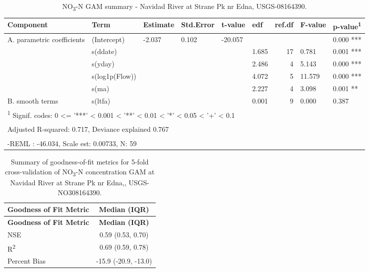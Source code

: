 \documentclass[
]{article}
\newenvironment{widestuff}{\begin{table}[h]\begin{adjustwidth}{-4.5cm}{-4.5cm}\centering}{\end{adjustwidth}\end{table}}
\begin{document}
\begin{widestuff}

\caption{NO\textsubscript{3}-N GAM summary - Navidad River at Strane Pk nr Edna, USGS-08164390.}
\centering
\begin{tabular}[t]{llllllrll}
\toprule
Component & Term & Estimate & Std.Error & t-value & edf & ref.df & F-value & p-value\textsuperscript{1}\\
\midrule
A. parametric coefficients & (Intercept) & -2.037 & 0.102 & -20.057 &  &  &  & 0.000 ***\\
\cmidrule{1-9}
 & s(ddate) &  &  &  & 1.685 & 17 & 0.781 & 0.001 ***\\

 & s(yday) &  &  &  & 2.486 & 4 & 5.143 & 0.000 ***\\

 & s(log1p(Flow)) &  &  &  & 4.072 & 5 & 11.579 & 0.000 ***\\

 & s(ma) &  &  &  & 2.227 & 4 & 3.098 & 0.001 **\\

\multirow[t]{-5}{*}{\raggedright\arraybackslash B. smooth terms} & s(ltfa) &  &  &  & 0.001 & 9 & 0.000 & 0.387\\
\bottomrule
\multicolumn{9}{l}{\textsuperscript{1} Signif. codes: 0 <= '***' < 0.001 < '**' < 0.01 < '*' < 0.05 < '+' < 0.1}\\
\multicolumn{9}{l}{\textsuperscript{} Adjusted R-squared: 0.717, Deviance explained 0.767}\\
\multicolumn{9}{l}{\textsuperscript{} -REML : -46.034, Scale est: 0.00733, N: 59}\\
\end{tabular}
\end{widestuff}

\hypertarget{tbl-NO308164390-CV}{}
\begin{longtable}[]{@{}lc@{}}
\caption{\label{tbl-NO308164390-CV}Summary of goodness-of-fit metrics
for 5-fold cross-validation of NO\textsubscript{3}-N concentration GAM
at Navidad River at Strane Pk nr Edna,,
USGS-NO308164390.}\tabularnewline
\toprule()
\textbf{Goodness of Fit Metric} & \textbf{Median (IQR)} \\
\midrule()
\endfirsthead
\toprule()
\textbf{Goodness of Fit Metric} & \textbf{Median (IQR)} \\
\midrule()
\endhead
NSE & 0.59 (0.53, 0.70) \\
R\textsuperscript{2} & 0.69 (0.59, 0.78) \\
Percent Bias & -15.9 (-20.9, -13.0) \\
\bottomrule()
\end{longtable}
\end{document}
